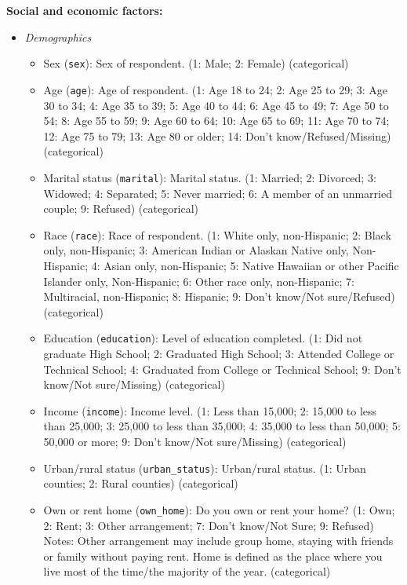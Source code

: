 \documentclass[
]{article}
\providecommand{\tightlist}{%
  \setlength{\itemsep}{0pt}\setlength{\parskip}{0pt}}
\begin{document}
\textbf{Social and economic factors:}

\begin{itemize}
\tightlist
\item
  \emph{Demographics}

  \begin{itemize}
  \tightlist
  \item
    Sex (\texttt{sex}): Sex of respondent. (1: Male; 2: Female) (categorical)
  \item
    Age (\texttt{age}): Age of respondent. (1: Age 18 to 24; 2: Age 25 to 29; 3: Age 30 to 34; 4: Age 35 to 39; 5: Age 40 to 44; 6: Age 45 to 49; 7: Age 50 to 54; 8: Age 55 to 59; 9: Age 60 to 64; 10: Age 65 to 69; 11: Age 70 to 74; 12: Age 75 to 79; 13: Age 80 or older; 14: Don't know/Refused/Missing) (categorical)
  \item
    Marital status (\texttt{marital}): Marital status. (1: Married; 2: Divorced; 3: Widowed; 4: Separated; 5: Never married; 6: A member of an unmarried couple; 9: Refused) (categorical)
  \item
    Race (\texttt{race}): Race of respondent. (1: White only, non-Hispanic; 2: Black only, non-Hispanic; 3: American Indian or Alaskan Native only, Non-Hispanic; 4: Asian only, non-Hispanic; 5: Native Hawaiian or other Pacific Islander only, Non-Hispanic; 6: Other race only, non-Hispanic; 7: Multiracial, non-Hispanic; 8: Hispanic; 9: Don't know/Not sure/Refused) (categorical)
  \item
    Education (\texttt{education}): Level of education completed. (1: Did not graduate High School; 2: Graduated High School; 3: Attended College or Technical School; 4: Graduated from College or Technical School; 9: Don't know/Not sure/Missing) (categorical)
  \item
    Income (\texttt{income}): Income level. (1: Less than 15,000; 2: 15,000 to less than 25,000; 3: 25,000 to less than 35,000; 4: 35,000 to less than 50,000; 5: 50,000 or more; 9: Don't know/Not sure/Missing) (categorical)
  \item
    Urban/rural status (\texttt{urban\_status}): Urban/rural status. (1: Urban counties; 2: Rural counties) (categorical)
  \item
    Own or rent home (\texttt{own\_home}): Do you own or rent your home? (1: Own; 2: Rent; 3: Other arrangement; 7: Don't know/Not Sure; 9: Refused) Notes: Other arrangement may include group home, staying with friends or family without paying rent. Home is defined as the place where you live most of the time/the majority of the year. (categorical)

\end{itemize}
\end{itemize}
\end{document}
